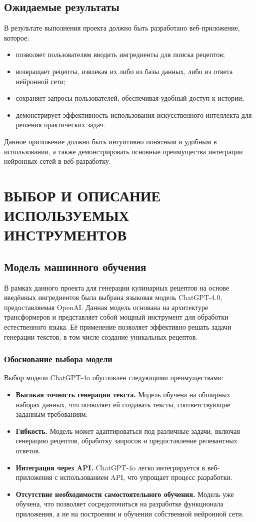 {\subsection*{Ожидаемые результаты}
В результате выполнения проекта должно быть разработано веб-приложение, которое:
\begin{itemize}
    \item позволяет пользователям вводить ингредиенты для поиска рецептов;
    \item возвращает рецепты, извлекая их либо из базы данных, либо из ответа нейронной сети;
    \item сохраняет запросы пользователей, обеспечивая удобный доступ к истории;
    \item демонстрирует эффективность использования искусственного интеллекта для решения практических задач.
\end{itemize}

Данное приложение должно быть интуитивно понятным и удобным в использовании, а также демонстрировать основные преимущества интеграции нейронных сетей в веб-разработку.

\newpage
  
\section{\MakeUppercase{Выбор и описание используемых инструментов}}
{
    \subsection{Модель машинного обучения}
    В рамках данного проекта для генерации кулинарных рецептов на основе введённых ингредиентов была выбрана языковая модель ChatGPT-4.0, предоставляемая OpenAI. Данная модель основана на архитектуре трансформеров и представляет собой мощный инструмент для обработки естественного языка. Её применение позволяет эффективно решать задачи генерации текстов, в том числе создание уникальных рецептов.

\subsubsection*{Обоснование выбора модели}
Выбор модели ChatGPT-4o обусловлен следующими преимуществами:
\begin{itemize}
    \item \textbf{Высокая точность генерации текста.} Модель обучена на обширных наборах данных, что позволяет ей создавать тексты, соответствующие заданным требованиям.
    \item \textbf{Гибкость.} Модель может адаптироваться под различные задачи, включая генерацию рецептов, обработку запросов и предоставление релевантных ответов.
    \item \textbf{Интеграция через API.} ChatGPT-4o легко интегрируется в веб-приложения с использованием API, что упрощает процесс разработки.
    \item \textbf{Отсутствие необходимости самостоятельного обучения.} Модель уже обучена, что позволяет сосредоточиться на разработке функционала приложения, а не на построении и обучении собственной нейронной сети.
\end{itemize}

}}
